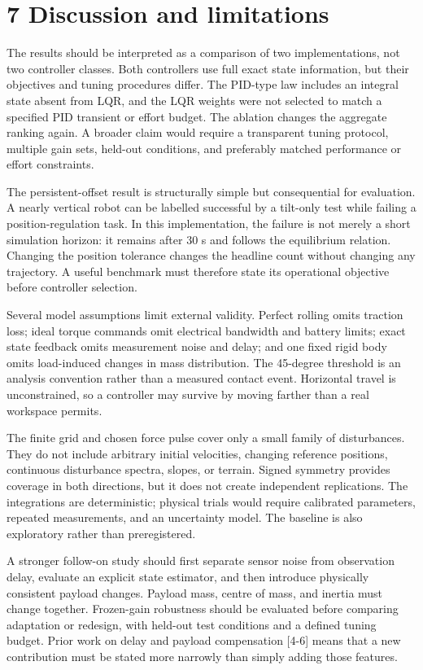 \documentclass[11pt,a4paper]{article}
\begin{document}
\section*{7 Discussion and limitations}
The results should be interpreted as a comparison of two implementations, not two controller classes. Both controllers use full exact state information, but their objectives and tuning procedures differ. The PID-type law includes an integral state absent from LQR, and the LQR weights were not selected to match a specified PID transient or effort budget. The ablation changes the aggregate ranking again. A broader claim would require a transparent tuning protocol, multiple gain sets, held-out conditions, and preferably matched performance or effort constraints.

The persistent-offset result is structurally simple but consequential for evaluation. A nearly vertical robot can be labelled successful by a tilt-only test while failing a position-regulation task. In this implementation, the failure is not merely a short simulation horizon: it remains after 30 s and follows the equilibrium relation. Changing the position tolerance changes the headline count without changing any trajectory. A useful benchmark must therefore state its operational objective before controller selection.

Several model assumptions limit external validity. Perfect rolling omits traction loss; ideal torque commands omit electrical bandwidth and battery limits; exact state feedback omits measurement noise and delay; and one fixed rigid body omits load-induced changes in mass distribution. The 45-degree threshold is an analysis convention rather than a measured contact event. Horizontal travel is unconstrained, so a controller may survive by moving farther than a real workspace permits.

The finite grid and chosen force pulse cover only a small family of disturbances. They do not include arbitrary initial velocities, changing reference positions, continuous disturbance spectra, slopes, or terrain. Signed symmetry provides coverage in both directions, but it does not create independent replications. The integrations are deterministic; physical trials would require calibrated parameters, repeated measurements, and an uncertainty model. The baseline is also exploratory rather than preregistered.

A stronger follow-on study should first separate sensor noise from observation delay, evaluate an explicit state estimator, and then introduce physically consistent payload changes. Payload mass, centre of mass, and inertia must change together. Frozen-gain robustness should be evaluated before comparing adaptation or redesign, with held-out test conditions and a defined tuning budget. Prior work on delay and payload compensation [4-6] means that a new contribution must be stated more narrowly than simply adding those features.
\end{document}

